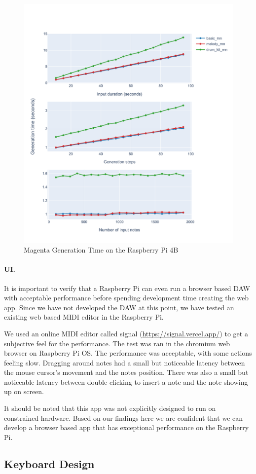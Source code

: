 \begin{figure}
  \centering
  \includegraphics[width=\linewidth]{image/perf.pdf}
  \caption{Magenta Generation Time on the Raspberry Pi 4B}
  \label{fig:magentaperf}
\end{figure}

\paragraph{UI.} It is important to verify that a Raspberry Pi can even run a browser based
DAW with acceptable performance before spending development time creating the web app.
Since we have not developed the DAW at this point, we have tested an existing web based
MIDI editor in the Raspberry Pi.

We used an online MIDI editor called signal (\url{https://signal.vercel.app/}) to get a
subjective feel for the performance. The test was ran in the chromium web browser on
Raspberry Pi OS. The performance was acceptable, with some actions feeling slow.
Dragging around notes had a small but noticeable latency between the mouse cursor's
movement and the notes position. There was also a small but noticeable latency between
double clicking to insert a note and the note showing up on screen.

It should be noted that this app was not explicitly designed to run on constrained
hardware. Based on our findings here we are confident that we can develop a browser based
app that has exceptional performance on the Raspberry Pi.


\subsection{Keyboard Design}
